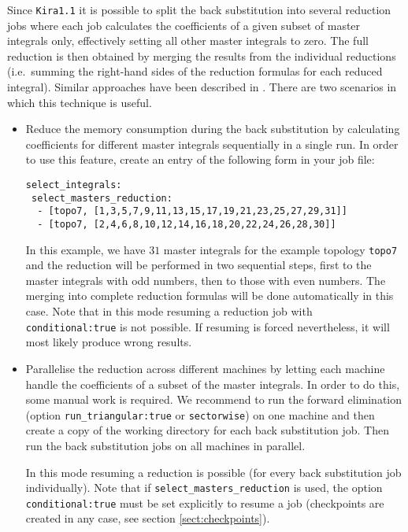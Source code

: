 \documentclass[a4paper,12pt]{article}
\newcommand*{\kira}{\texttt{Kira}}
\begin{document}
Since \kira{}\;\texttt{1.1} it is possible to split the back substitution into
several reduction jobs where each job calculates the coefficients of a given
subset of master integrals only, effectively setting all other master integrals
to zero.
The full reduction is then obtained by merging the results from the individual
reductions (i.e.\ summing the right-hand sides of the reduction formulas for
each reduced integral).
Similar approaches have been described in \cite{Boehm:2018fpv,Chawdhry:2018awn}.
There are two scenarios in which this technique is useful.
\begin{itemize}
  \item Reduce the memory consumption during the back substitution by
    calculating coefficients for different master integrals sequentially in a
    single run.
    In order to use this feature, create an entry of the following form in your
    job file:
\begin{verbatim}
select_integrals:
 select_masters_reduction:
  - [topo7, [1,3,5,7,9,11,13,15,17,19,21,23,25,27,29,31]]
  - [topo7, [2,4,6,8,10,12,14,16,18,20,22,24,26,28,30]]
\end{verbatim}
    In this example, we have $31$ master integrals for the example topology
    \texttt{topo7} and the reduction will be performed in two sequential steps,
    first to the master integrals with odd numbers, then to those with even
    numbers.
    The merging into complete reduction formulas will be done automatically in
    this case.
    Note that in this mode resuming a reduction job with
    \texttt{conditional:\;true} is not possible. If resuming is forced
    nevertheless, it will most likely produce wrong results.
  \item Parallelise the reduction across different machines by letting each
    machine handle the coefficients of a subset of the master integrals.
    In order to do this, some manual work is required.
    We recommend to run the forward elimination (option
    \texttt{run\_triangular:\;true} or \texttt{sectorwise}) on one machine and
    then create a copy of the working directory for each back substitution job.
    Then run the back substitution jobs on all machines in parallel.

    In this mode resuming a reduction is possible (for every back substitution
    job individually). Note that if \texttt{select\_masters\_reduction} is used,
    the option \texttt{conditional:\;true} must be set explicitly to resume a
    job (checkpoints are created in any case, see section
    \ref{sect:checkpoints}).
\end{itemize}
\end{document}
